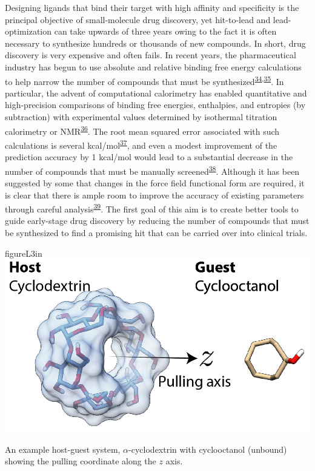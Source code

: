 \documentclass[11pt,notitlepage]{article}
\begin{document}
Designing ligands that bind their target with high affinity and
specificity is the principal objective of small-molecule drug discovery,
yet hit-to-lead and lead-optimization can take upwards of three years
owing to the fact it is often necessary to synthesize hundreds or
thousands of new compounds. In short, drug discovery is very expensive
and often fails. In recent years, the pharmaceutical industry has begun
to use absolute and relative binding free energy calculations to help
narrow the number of compounds that must be
synthesized\textsuperscript{\protect\hyperlink{ref-1FiDpP1LR}{34},\protect\hyperlink{ref-1BwXH3GFO}{35}}.
In particular, the advent of computational calorimetry has enabled
quantitative and high-precision comparisons of binding free energies,
enthalpies, and entropies (by subtraction) with experimental values
determined by isothermal titration calorimetry or
NMR\textsuperscript{\protect\hyperlink{ref-1935a9V0d}{36}}. The root
mean squared error associated with such calculations is several
kcal/mol\textsuperscript{\protect\hyperlink{ref-LWd10vQy}{37}}, and even
a modest improvement of the prediction accuracy by 1 kcal/mol would lead
to a substantial decrease in the number of compounds that must be
manually screened\textsuperscript{\protect\hyperlink{ref-fC0t6Cy1}{38}}.
Although it has been suggested by some that changes in the force field
functional form are required, it is clear that there is ample room to
improve the accuracy of existing parameters through careful
analysis\textsuperscript{\protect\hyperlink{ref-LOjcxYqt}{39}}. The
first goal of this aim is to create better tools to guide early-stage
drug discovery by reducing the number of compounds that must be
synthesized to find a promising hit that can be carried over into
clinical trials.


\begin{wrapfloat}{figure}{L}{3in}
\centering
\includegraphics{content/images/APR-annotated.png}
\caption{An example host-guest system, \(\alpha\)-cyclodextrin with
cyclooctanol (unbound) showing the pulling coordinate along the \(z\)
axis.}
\label{fig:apr}
\end{wrapfloat}
\end{document}
